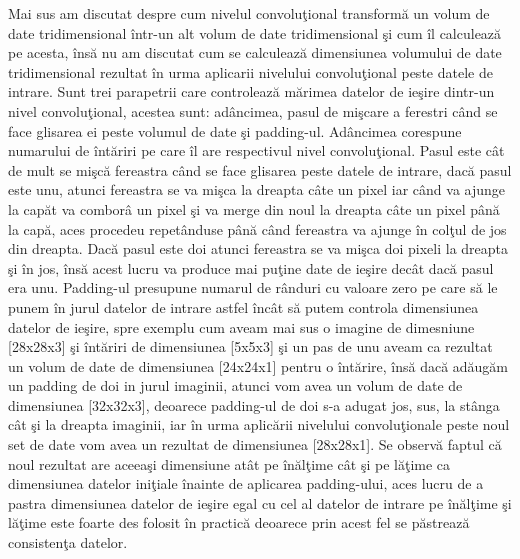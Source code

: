 Mai sus am discutat despre cum nivelul convolu\c{t}ional transform\u{a} un volum de date tridimensional \^{i}ntr-un alt volum de date tridimensional \c{s}i cum \^{i}l calculeaz\u{a} pe acesta, \^{i}ns\u{a} nu am discutat cum se calculeaz\u{a} dimensiunea volumului de date tridimensional rezultat \^{i}n urma aplicarii nivelului convolu\c{t}ional peste  datele de intrare. Sunt trei parapetrii care controleaz\u{a} m\u{a}rimea datelor de ie\c{s}ire dintr-un nivel convolu\c{t}ional, acestea sunt: ad\^{a}ncimea, pasul de mi\c{s}care a ferestri c\^{a}nd se face glisarea ei peste volumul de date \c{s}i padding-ul. Ad\^{a}ncimea corespune numarului de \^{i}nt\u{a}riri pe care \^{i}l are respectivul nivel convolu\c{t}ional. Pasul este c\^{a}t de mult se mi\c{s}c\u{a} fereastra c\^{a}nd se face glisarea peste datele de intrare, dac\u{a} pasul este unu, atunci fereastra se va mi\c{s}ca la dreapta c\^{a}te un pixel iar c\^{a}nd va ajunge la cap\u{a}t va combor\^{a} un pixel \c{s}i va merge din noul la dreapta c\^{a}te un pixel p\^{a}n\u{a} la cap\u{a}, aces procedeu repet\^{a}nduse p\^{a}n\u{a} c\^{a}nd fereastra va ajunge \^{i}n col\c{t}ul de jos din dreapta. Dac\u{a} pasul este doi atunci fereastra se va mi\c{s}ca doi pixeli la dreapta \c{s}i \^{i}n jos, \^{i}ns\u{a} acest lucru va produce mai pu\c{t}ine date de ie\c{s}ire dec\^{a}t dac\u{a} pasul era unu. Padding-ul presupune numarul de r\^{a}nduri cu valoare zero pe care s\u{a} le punem \^{i}n jurul datelor de intrare astfel \^{i}nc\^{a}t s\u{a} putem controla dimensiunea datelor de ie\c{s}ire, spre exemplu cum aveam mai sus o imagine de dimesniune [28x28x3] \c{s}i \^{i}nt\u{a}riri de dimensiunea [5x5x3] \c{s}i un pas de unu aveam ca rezultat un volum de date de dimensiunea [24x24x1] pentru o \^{i}nt\u{a}rire, \^{i}ns\u{a} dac\u{a} ad\u{a}ug\u{a}m un padding de doi in jurul imaginii, atunci vom avea un volum de date de dimensiunea [32x32x3], deoarece padding-ul de doi s-a adugat jos, sus, la st\^{a}nga c\^{a}t \c{s}i la dreapta imaginii, iar \^{i}n urma aplic\u{a}rii nivelului convolu\c{t}ionale peste noul set de date vom avea un rezultat de dimensiunea [28x28x1]. Se observ\u{a} faptul c\u{a} noul rezultat are aceea\c{s}i dimensiune at\^{a}t pe \^{i}n\u{a}l\c{t}ime c\^{a}t \c{s}i pe l\u{a}\c{t}ime ca dimensiunea datelor ini\c{t}iale \^{i}nainte de aplicarea padding-ului, aces lucru  de a pastra dimensiunea datelor de ie\c{s}ire egal cu cel al datelor de intrare pe \^{i}n\u{a}l\c{t}ime \c{s}i l\u{a}\c{t}ime este foarte des folosit \^{i}n practic\u{a} deoarece prin acest fel se p\u{a}streaz\u{a} consisten\c{t}a datelor.

